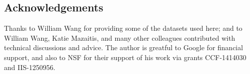 \documentclass{article}
\begin{document}
\subsection*{Acknowledgements}

Thanks to William Wang for providing some of the datasets used here;
and to William Wang, Katie Mazaitis, and many other colleagues
contributed with technical discussions and advice.  The author is
greatful to Google for financial support, and also to NSF for their
support of his work via grants CCF-1414030 and IIS-1250956.

\newpage


  
% 
\end{document}
